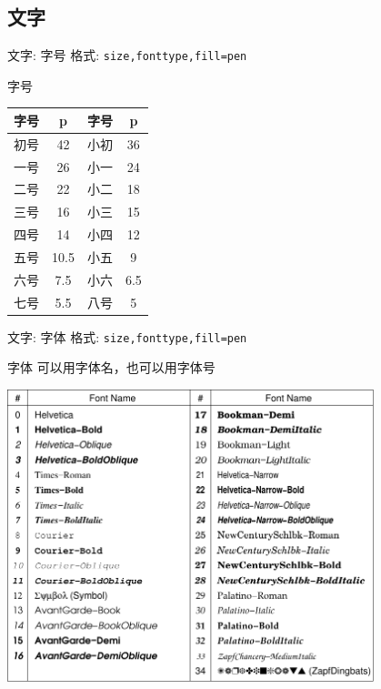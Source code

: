 \documentclass[UTF8, 11pt]{ctexbeamer}
\begin{document}
\subsection{文字}
\begin{frame}[fragile]{文字: 字号}
格式: \verb|size,fonttype,fill=pen|
\begin{block}{字号}
\begin{center}
\begin{tabular}{c|c|c|c}
\hline
字号 & p	  & 字号	& p  \\
\hline
初号 & 42	  & 小初	& 36 \\
一号 & 26	  & 小一	& 24 \\
二号 & 22	  & 小二	& 18 \\
三号 & 16	  & 小三	& 15 \\
四号 & 14	  & 小四	& 12 \\
五号 & 10.5 &	小五	& 9  \\
六号 & 7.5  &	小六	& 6.5\\
七号 & 5.5  &	八号	& 5  \\
\hline
\end{tabular}
\end{center}
\end{block}
\end{frame}

\begin{frame}[fragile]{文字: 字体}
格式: \verb|size,fonttype,fill=pen|
\begin{block}{字体}
可以用字体名，也可以用字体号
\begin{center}
\includegraphics[width=0.8\textwidth]{GMT_fonts}
\end{center}
\end{block}
\end{frame}
\end{document}
